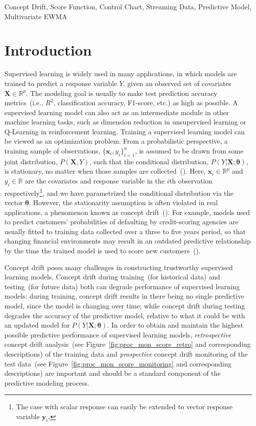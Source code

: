 \documentclass[twoside,11pt]{article}
\begin{document}
\begin{keywords} 	
  Concept Drift, Score Function, Control Chart, Streaming Data, Predictive Model, Multivariate EWMA
\end{keywords}

\section{Introduction}
\label{s:intro}
Supervised learning is widely used in many applications, in which models are trained to predict a response variable $Y$, given an observed set of covariates $\bm{X} \in \mathbb{R}^p$. The modeling goal is usually to make test prediction accuracy metrics~(i.e., $R^2$, classification accuracy, F1-score, etc.) as high as possible. A supervised learning model can also act as an intermediate module in other machine learning tasks, such as dimension reduction in unsupervised learning or Q-Learning in reinforcement learning. Training a supervised learning model can be viewed as an optimization problem. From a probabilistic perspective, a training sample of observations, $\{\bm {x}_i, y_i\}_{i=1}^n$, is assumed to be drawn from some joint distribution, $P (\bm {X}, Y)$, such that the conditional distribution, $P(Y|\bm{X};\bm{\theta})$, is stationary, no matter when those samples are collected~(\cite{hulten2001mining}). Here, {$\bm {x}_i \in \mathbb{R}^{p}$ and $y_i \in \mathbb{R}$ are the covariates and response variable in the $i$th observation respectively}\footnote{The case with scalar response can easily be extended to vector response variable $\bm {y}_i$.}, and we have parametrized the conditional distribution via the vector $\bm{\theta}$. However, the stationarity assumption is often violated in real applications, a phenomenon known as concept drift~(\cite{moreno2012unifying,vzliobaite2016overview}). For example, models used to predict customers' probabilities of defaulting by credit-scoring agencies are usually fitted to training data collected over a three to five years period, so that changing financial environments may result in an outdated predictive relationship by the time the trained model is used to score new customers~(\cite{crook1992degradation,vzliobaite2016overview}). 

Concept drift poses many challenges in constructing trustworthy supervised learning models. Concept drift during training~(for historical data) and testing~(for future data) both can degrade performance of supervised learning models: during training, concept drift results in there being no single predictive model, since the model is changing over time; while concept drift during testing degrades the accuracy of the predictive model, relative to what it could be with an updated model for $P(Y|\bm{X};\bm{\theta})$. In order to obtain and maintain the highest possible predictive performance of supervised learning models, \textit{retrospective} concept drift analysis~(see Figure~\ref{fig:proc_mon_score_retro} and corresponding descriptions) of the training data and \textit{prospective} concept drift monitoring of the test data~(see Figure~\ref{fig:proc_mon_score_monitoring} and corresponding descriptions) are important and should be a standard component of the predictive modeling process.
\end{document}
